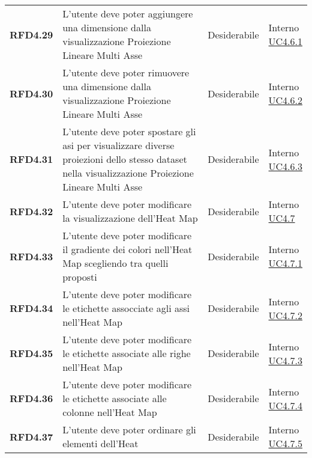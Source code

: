 \begin{longtable}[H]{>{\raggedright\bfseries}m{20mm} >{\raggedright}m{90mm} >{\raggedright}m{28mm} >{\raggedright\arraybackslash}m{30mm}}
    RFD4.29
    & L'utente deve poter aggiungere una dimensione dalla visualizzazione Proiezione Lineare Multi Asse
    & Desiderabile
    & \makecell{ Interno \\  \hyperref[par:uc4.6.1]{UC4.6.1} }\\

    RFD4.30
    & L'utente deve poter rimuovere una dimensione dalla visualizzazione Proiezione Lineare Multi Asse
    & Desiderabile
    & \makecell{ Interno \\  \hyperref[par:uc4.6.2]{UC4.6.2} }\\

    RFD4.31
    & L'utente deve poter spostare gli asi per visualizzare diverse proiezioni dello stesso dataset nella visualizzazione Proiezione Lineare Multi Asse
    & Desiderabile
    & \makecell{ Interno \\  \hyperref[par:uc4.6.3]{UC4.6.3} }\\

    RFD4.32
    & L'utente deve poter modificare la visualizzazione dell'Heat Map
    & Desiderabile
    & \makecell{ Interno \\  \hyperref[ssub:uc4.7]{UC4.7} }\\

    RFD4.33
    & L'utente deve poter modificare il gradiente dei colori nell'Heat Map scegliendo tra quelli proposti
    & Desiderabile
    & \makecell{ Interno \\  \hyperref[par:uc4.7.1]{UC4.7.1} }\\

    RFD4.34
    & L'utente deve poter modificare le etichette assocciate agli assi nell'Heat Map
    & Desiderabile
    & \makecell{ Interno \\  \hyperref[spar:uc4.7.2]{UC4.7.2} }\\

    RFD4.35
    & L'utente deve poter modificare le etichette associate alle righe nell'Heat Map
    & Desiderabile
    & \makecell{ Interno \\  \hyperref[spar:uc4.7.3]{UC4.7.3} }\\

    RFD4.36
    & L'utente deve poter modificare le etichette associate alle colonne nell'Heat Map
    & Desiderabile
    & \makecell{ Interno \\  \hyperref[spar:uc4.7.4]{UC4.7.4} }\\

    RFD4.37
    & L'utente deve poter ordinare gli elementi dell'Heat
    & Desiderabile
    & \makecell{ Interno \\  \hyperref[spar:uc4.7.5]{UC4.7.5} }\\


\end{longtable}
